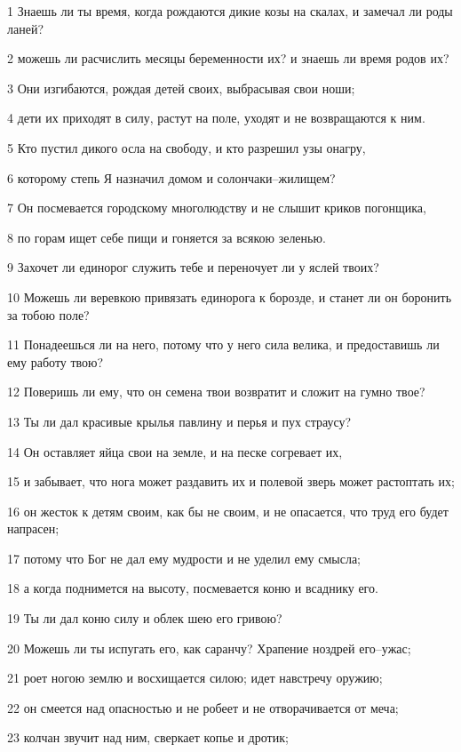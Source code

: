 \par 1 Знаешь ли ты время, когда рождаются дикие козы на скалах, и замечал ли роды ланей?
\par 2 можешь ли расчислить месяцы беременности их? и знаешь ли время родов их?
\par 3 Они изгибаются, рождая детей своих, выбрасывая свои ноши;
\par 4 дети их приходят в силу, растут на поле, уходят и не возвращаются к ним.
\par 5 Кто пустил дикого осла на свободу, и кто разрешил узы онагру,
\par 6 которому степь Я назначил домом и солончаки--жилищем?
\par 7 Он посмевается городскому многолюдству и не слышит криков погонщика,
\par 8 по горам ищет себе пищи и гоняется за всякою зеленью.
\par 9 Захочет ли единорог служить тебе и переночует ли у яслей твоих?
\par 10 Можешь ли веревкою привязать единорога к борозде, и станет ли он боронить за тобою поле?
\par 11 Понадеешься ли на него, потому что у него сила велика, и предоставишь ли ему работу твою?
\par 12 Поверишь ли ему, что он семена твои возвратит и сложит на гумно твое?
\par 13 Ты ли дал красивые крылья павлину и перья и пух страусу?
\par 14 Он оставляет яйца свои на земле, и на песке согревает их,
\par 15 и забывает, что нога может раздавить их и полевой зверь может растоптать их;
\par 16 он жесток к детям своим, как бы не своим, и не опасается, что труд его будет напрасен;
\par 17 потому что Бог не дал ему мудрости и не уделил ему смысла;
\par 18 а когда поднимется на высоту, посмевается коню и всаднику его.
\par 19 Ты ли дал коню силу и облек шею его гривою?
\par 20 Можешь ли ты испугать его, как саранчу? Храпение ноздрей его--ужас;
\par 21 роет ногою землю и восхищается силою; идет навстречу оружию;
\par 22 он смеется над опасностью и не робеет и не отворачивается от меча;
\par 23 колчан звучит над ним, сверкает копье и дротик;
